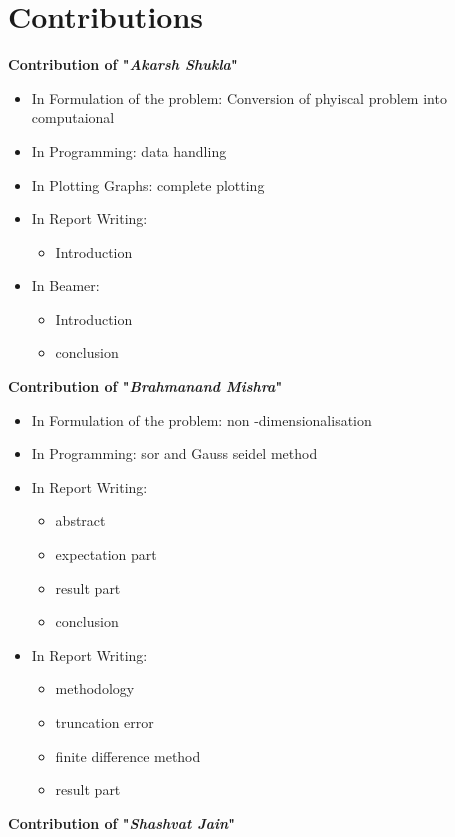 \section{Contributions}
	{\large{\bf {Contribution of "{\it Akarsh Shukla}"}}}
	\begin{itemize}
		\item In Formulation of the problem: Conversion of phyiscal problem into computaional 
		\item  In Programming: data handling
		\item  In Plotting Graphs: complete plotting
		\item  In Report Writing: 
			\begin{itemize}
				\item  Introduction
			\end{itemize}
		\item  In Beamer: 
		\begin{itemize}
			\item  Introduction
			\item conclusion
			
		\end{itemize}

		
	\end{itemize}
	{\large{\bf {Contribution of "{\it Brahmanand Mishra}"}}}
	\begin{itemize}
		\item In Formulation of the problem:  non -dimensionalisation 
		\item  In Programming: sor and Gauss seidel method 
		\item  In Report Writing:
			\begin{itemize}
				\item abstract
				\item expectation part
				\item result part 
				\item conclusion
			\end{itemize}
		\item  In Report Writing:
		\begin{itemize}
			\item methodology
			\item truncation error
			\item finite difference method
			\item result part 
		\end{itemize}
		
	\end{itemize}
	{\large{\bf {Contribution of "{\it Shashvat Jain}"}}}
